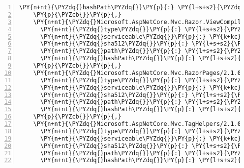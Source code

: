 \begin{Verbatim}[commandchars=\\\{\},numbers=left,firstnumber=1,stepnumber=1,numberblanklines=0]
      \PY{n+nt}{\PYZdq{}hashPath\PYZdq{}}\PY{p}{:} \PY{l+s+s2}{\PYZdq{}microsoft.aspnetcore.mvc.razor.extensions.2.1.0\PYZhy{}rc1\PYZhy{}final.nupkg.sha512\PYZdq{}}
    \PY{p}{\PYZcb{}}\PY{p}{,}
    \PY{n+nt}{\PYZdq{}Microsoft.AspNetCore.Mvc.Razor.ViewCompilation/2.1.0\PYZhy{}rc1\PYZhy{}final\PYZdq{}}\PY{p}{:} \PY{p}{\PYZob{}}
      \PY{n+nt}{\PYZdq{}type\PYZdq{}}\PY{p}{:} \PY{l+s+s2}{\PYZdq{}package\PYZdq{}}\PY{p}{,}
      \PY{n+nt}{\PYZdq{}serviceable\PYZdq{}}\PY{p}{:} \PY{k+kc}{true}\PY{p}{,}
      \PY{n+nt}{\PYZdq{}sha512\PYZdq{}}\PY{p}{:} \PY{l+s+s2}{\PYZdq{}sha512\PYZhy{}JxTKXC4L8gTWsbcPAuY+ZCx/0cn+AxecZXoY8GSpLGbc0Q3KT7i5csKp7KHCl5v0jyvApo0P2rSYnI9Yschjdg==\PYZdq{}}\PY{p}{,}
      \PY{n+nt}{\PYZdq{}path\PYZdq{}}\PY{p}{:} \PY{l+s+s2}{\PYZdq{}microsoft.aspnetcore.mvc.razor.viewcompilation/2.1.0\PYZhy{}rc1\PYZhy{}final\PYZdq{}}\PY{p}{,}
      \PY{n+nt}{\PYZdq{}hashPath\PYZdq{}}\PY{p}{:} \PY{l+s+s2}{\PYZdq{}microsoft.aspnetcore.mvc.razor.viewcompilation.2.1.0\PYZhy{}rc1\PYZhy{}final.nupkg.sha512\PYZdq{}}
    \PY{p}{\PYZcb{}}\PY{p}{,}
    \PY{n+nt}{\PYZdq{}Microsoft.AspNetCore.Mvc.RazorPages/2.1.0\PYZhy{}rc1\PYZhy{}final\PYZdq{}}\PY{p}{:} \PY{p}{\PYZob{}}
      \PY{n+nt}{\PYZdq{}type\PYZdq{}}\PY{p}{:} \PY{l+s+s2}{\PYZdq{}package\PYZdq{}}\PY{p}{,}
      \PY{n+nt}{\PYZdq{}serviceable\PYZdq{}}\PY{p}{:} \PY{k+kc}{true}\PY{p}{,}
      \PY{n+nt}{\PYZdq{}sha512\PYZdq{}}\PY{p}{:} \PY{l+s+s2}{\PYZdq{}sha512\PYZhy{}9Yfk5Mv9k/28aGz0UeT/XL/B2ongkFARht7JtvL5NI8/C0cOubfGtcemKoGTN67L6etkK6wg9qao9Uc0rXsVCA==\PYZdq{}}\PY{p}{,}
      \PY{n+nt}{\PYZdq{}path\PYZdq{}}\PY{p}{:} \PY{l+s+s2}{\PYZdq{}microsoft.aspnetcore.mvc.razorpages/2.1.0\PYZhy{}rc1\PYZhy{}final\PYZdq{}}\PY{p}{,}
      \PY{n+nt}{\PYZdq{}hashPath\PYZdq{}}\PY{p}{:} \PY{l+s+s2}{\PYZdq{}microsoft.aspnetcore.mvc.razorpages.2.1.0\PYZhy{}rc1\PYZhy{}final.nupkg.sha512\PYZdq{}}
    \PY{p}{\PYZcb{}}\PY{p}{,}
    \PY{n+nt}{\PYZdq{}Microsoft.AspNetCore.Mvc.TagHelpers/2.1.0\PYZhy{}rc1\PYZhy{}final\PYZdq{}}\PY{p}{:} \PY{p}{\PYZob{}}
      \PY{n+nt}{\PYZdq{}type\PYZdq{}}\PY{p}{:} \PY{l+s+s2}{\PYZdq{}package\PYZdq{}}\PY{p}{,}
      \PY{n+nt}{\PYZdq{}serviceable\PYZdq{}}\PY{p}{:} \PY{k+kc}{true}\PY{p}{,}
      \PY{n+nt}{\PYZdq{}sha512\PYZdq{}}\PY{p}{:} \PY{l+s+s2}{\PYZdq{}sha512\PYZhy{}JQ70TegwlG2awrWwPDVYMFxYAWanYWTRRfMKzp/1K4smoRuPtilv++7+Ug4zOjR9GLc1NOgA/FwmN8IHodZAhA==\PYZdq{}}\PY{p}{,}
      \PY{n+nt}{\PYZdq{}path\PYZdq{}}\PY{p}{:} \PY{l+s+s2}{\PYZdq{}microsoft.aspnetcore.mvc.taghelpers/2.1.0\PYZhy{}rc1\PYZhy{}final\PYZdq{}}\PY{p}{,}
      \PY{n+nt}{\PYZdq{}hashPath\PYZdq{}}\PY{p}{:} \PY{l+s+s2}{\PYZdq{}microsoft.aspnetcore.mvc.taghelpers.2.1.0\PYZhy{}rc1\PYZhy{}final.nupkg.sha512\PYZdq{}}

\end{Verbatim}
